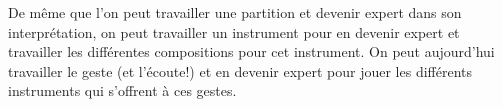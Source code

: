 De même que l'on peut travailler une partition et devenir expert dans son interprétation, on peut travailler un instrument pour en devenir expert et travailler les différentes compositions pour cet instrument. On peut aujourd'hui travailler le geste (et l'écoute!) et en devenir expert pour jouer les différents instruments qui s'offrent à ces gestes.